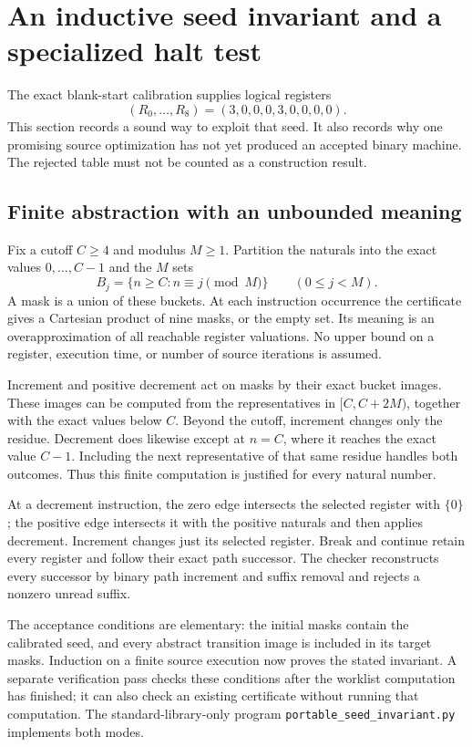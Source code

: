 \section{An inductive seed invariant and a specialized halt test}
\label{sec:seed-invariant}

The exact blank-start calibration supplies logical registers
\[
 (R_0,\ldots,R_8)=(3,0,0,0,3,0,0,0,0).
\]
This section records a sound way to exploit that seed.  It also records why
one promising source optimization has not yet produced an accepted binary
machine.  The rejected table must not be counted as a construction result.

\subsection{Finite abstraction with an unbounded meaning}

Fix a cutoff $C\geq4$ and modulus $M\geq1$.  Partition the naturals into
the exact values $0,\ldots,C-1$ and the $M$ sets
\[
 B_j=\{n\geq C:n\equiv j\pmod M\}\qquad(0\leq j<M).
\]
A mask is a union of these buckets.  At each instruction occurrence the
certificate gives a Cartesian product of nine masks, or the empty set.
Its meaning is an overapproximation of all reachable register valuations.
No upper bound on a register, execution time, or number of source iterations
is assumed.

Increment and positive decrement act on masks by their exact bucket images.
These images can be computed from the representatives in
$[C,C+2M)$, together with the exact values below $C$.  Beyond the cutoff,
increment changes only the residue.  Decrement does likewise except at
$n=C$, where it reaches the exact value $C-1$.  Including the next
representative of that same residue handles both outcomes.  Thus this
finite computation is justified for every natural number.

At a decrement instruction, the zero edge intersects the selected register
with $\{0\}$; the positive edge intersects it with the positive naturals
and then applies decrement.  Increment changes just its selected register.
Break and continue retain every register and follow their exact path
successor.  The checker reconstructs every successor by binary path
increment and suffix removal and rejects a nonzero unread suffix.

The acceptance conditions are elementary: the initial masks contain the
calibrated seed, and every abstract transition image is included in its
target masks.  Induction on a finite source execution now proves the stated
invariant.  A separate verification pass checks these conditions after the
worklist computation has finished; it can also check an existing certificate
without running that computation.  The standard-library-only program
\texttt{portable\_seed\_invariant.py} implements both modes.

